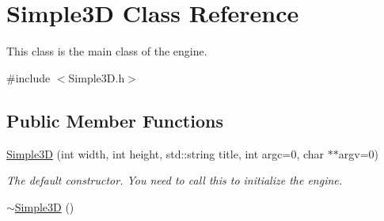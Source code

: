 \hypertarget{class_simple3_d}{
\section{Simple3D Class Reference}
\label{class_simple3_d}
}


This class is the main class of the engine.  




{\ttfamily \#include $<$Simple3D.h$>$}

\subsection*{Public Member Functions}
\begin{DoxyCompactItemize}
\item 
\hyperlink{class_simple3_d_a7644ace43261dd71e7f3cb9c9659025d}{Simple3D} (int width, int height, std::string title, int argc=0, char $\ast$$\ast$argv=0)
\begin{DoxyCompactList}\small\item\em The default constructor. You need to call this to initialize the engine. \item\end{DoxyCompactList}\item 
\hypertarget{class_simple3_d_a859666c712fd07748e9fca5938bbfa55}{
\hyperlink{class_simple3_d_a859666c712fd07748e9fca5938bbfa55}{$\sim$Simple3D} ()}
\label{class_simple3_d_a859666c712fd07748e9fca5938bbfa55}


\end{DoxyCompactItemize}

